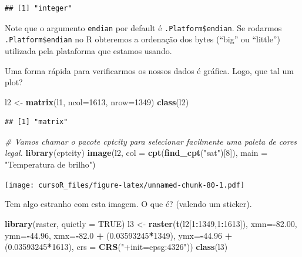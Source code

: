 \documentclass[]{book}
\newenvironment{Shaded}{\begin{snugshade}}{\end{snugshade}}
\newcommand{\KeywordTok}[1]{\textcolor[rgb]{0.13,0.29,0.53}{\textbf{#1}}}
\newcommand{\DataTypeTok}[1]{\textcolor[rgb]{0.13,0.29,0.53}{#1}}
\newcommand{\DecValTok}[1]{\textcolor[rgb]{0.00,0.00,0.81}{#1}}
\newcommand{\FloatTok}[1]{\textcolor[rgb]{0.00,0.00,0.81}{#1}}
\newcommand{\StringTok}[1]{\textcolor[rgb]{0.31,0.60,0.02}{#1}}
\newcommand{\CommentTok}[1]{\textcolor[rgb]{0.56,0.35,0.01}{\textit{#1}}}
\newcommand{\OtherTok}[1]{\textcolor[rgb]{0.56,0.35,0.01}{#1}}
\newcommand{\OperatorTok}[1]{\textcolor[rgb]{0.81,0.36,0.00}{\textbf{#1}}}
\newcommand{\NormalTok}[1]{#1}
\theoremstyle{definition}
\theoremstyle{definition}
\theoremstyle{definition}
\theoremstyle{remark}
\begin{document}
\begin{verbatim}
## [1] "integer"
\end{verbatim}

Note que o argumento \texttt{endian} por default é
\texttt{.Platform\$endian}. Se rodarmos \texttt{.Platform\$endian} no R
obteremos a ordenação dos bytes (``big'' ou ``little'') utilizada pela
plataforma que estamos usando.

Uma forma rápida para verificarmos os nossos dados é gráfica. Logo, que
tal um plot?

\begin{Shaded}
\begin{Highlighting}[]
\NormalTok{l2 <-}\StringTok{ }\KeywordTok{matrix}\NormalTok{(l1, }\DataTypeTok{ncol=}\DecValTok{1613}\NormalTok{, }\DataTypeTok{nrow=}\DecValTok{1349}\NormalTok{)}
\KeywordTok{class}\NormalTok{(l2)}
\end{Highlighting}
\end{Shaded}

\begin{verbatim}
## [1] "matrix"
\end{verbatim}

\begin{Shaded}
\begin{Highlighting}[]
\CommentTok{# Vamos chamar o pacote cptcity para selecionar facilmente uma paleta de cores legal.}
\KeywordTok{library}\NormalTok{(cptcity)   }
\KeywordTok{image}\NormalTok{(l2,}
      \DataTypeTok{col =} \KeywordTok{cpt}\NormalTok{(}\KeywordTok{find_cpt}\NormalTok{(}\StringTok{"sat"}\NormalTok{)[}\DecValTok{8}\NormalTok{]),}
      \DataTypeTok{main =} \StringTok{"Temperatura de brilho"}\NormalTok{) }
\end{Highlighting}
\end{Shaded}

\texttt{[image: cursoR\_files/figure-latex/unnamed-chunk-80-1.pdf]}

Tem algo estranho com esta imagem. O que é? (valendo um sticker).

\begin{Shaded}
\begin{Highlighting}[]
\KeywordTok{library}\NormalTok{(raster, }\DataTypeTok{quietly =} \OtherTok{TRUE}\NormalTok{)}
\NormalTok{l3 <-}\StringTok{ }\KeywordTok{raster}\NormalTok{(}\KeywordTok{t}\NormalTok{(l2[}\DecValTok{1}\OperatorTok{:}\DecValTok{1349}\NormalTok{,}\DecValTok{1}\OperatorTok{:}\DecValTok{1613}\NormalTok{]),}
                     \DataTypeTok{xmn=}\OperatorTok{-}\FloatTok{82.00}\NormalTok{,}
                     \DataTypeTok{ymn=}\OperatorTok{-}\FloatTok{44.96}\NormalTok{,}
                     \DataTypeTok{xmx=}\OperatorTok{-}\FloatTok{82.0}  \OperatorTok{+}\StringTok{ }\NormalTok{(}\FloatTok{0.03593245}\OperatorTok{*}\DecValTok{1349}\NormalTok{), }
                     \DataTypeTok{ymx=}\OperatorTok{-}\FloatTok{44.96} \OperatorTok{+}\StringTok{ }\NormalTok{(}\FloatTok{0.03593245}\OperatorTok{*}\DecValTok{1613}\NormalTok{),}
                     \DataTypeTok{crs =} \KeywordTok{CRS}\NormalTok{(}\StringTok{"+init=epsg:4326"}\NormalTok{))}
\KeywordTok{class}\NormalTok{(l3)}
\end{Highlighting}
\end{Shaded}
\end{document}
